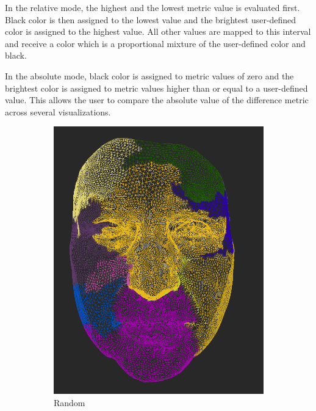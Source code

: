 In the relative mode, the highest and the lowest metric value is evaluated first. Black color is then assigned to the lowest value and the brightest user-defined color is assigned to the highest value. All other values are mapped to this interval and receive a color which is a proportional mixture of the user-defined color and black.

In the absolute mode, black color is assigned to metric values of zero and the brightest color is assigned to metric values higher than or equal to a user-defined value. This allows the user to compare the absolute value of the difference metric across several visualizations.

\begin{figure}[h]
\centering
	\begin{subfigure}{0.4\textwidth}
	\includegraphics[width=\textwidth]{./img/meshdiff-clustercolor-random.PNG}
    \caption{Random}
    \label{fig:meshdiff-clustercolor_random}
	\end{subfigure}
    \qquad
    \begin{subfigure}{0.4\textwidth}

\end{subfigure}
\end{figure}
